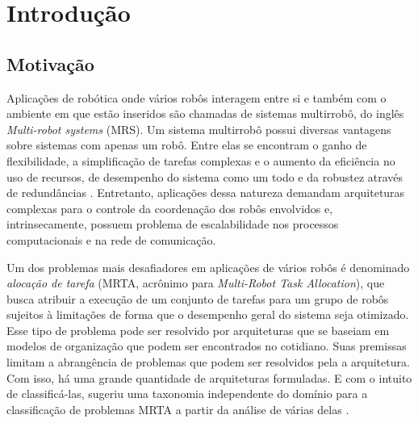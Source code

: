\chapter[Introdução]{Introdução} \label{cap:introducao}

    \section{Motivação} \label{sec:motivacao}
        Aplicações de robótica onde vários robôs interagem entre si e também com o ambiente em que estão inseridos são chamadas de sistemas multirrobô, do inglês \textit{Multi-robot systems} (MRS). Um sistema multirrobô possui diversas vantagens sobre sistemas com apenas um robô. Entre elas se encontram o ganho de flexibilidade, a simplificação de tarefas complexas e o aumento da eficiência no uso de recursos, de desempenho do sistema como um todo e da robustez através de redundâncias \cite{ref:cao1997cooperative, ref:dudek1996taxonomy, ref:zlot2002multi}. Entretanto, aplicações dessa natureza demandam arquiteturas complexas para o controle da coordenação dos robôs envolvidos e, intrinsecamente, possuem problema de escalabilidade nos processos computacionais e na rede de comunicação. 
        
        Um dos problemas mais desafiadores em aplicações de vários robôs é denominado \textit{alocação de tarefa} (MRTA, acrônimo para \textit{Multi-Robot Task Allocation}), que busca atribuir a execução de um conjunto de tarefas para um grupo de robôs sujeitos à limitações de forma que o desempenho geral do sistema seja otimizado. Esse tipo de problema pode ser resolvido por arquiteturas que se baseiam em modelos de organização que podem ser encontrados no cotidiano. Suas premissas limitam a abrangência de problemas que podem ser resolvidos pela a arquitetura. Com isso, há uma grande quantidade de arquiteturas formuladas. E com o intuito de classificá-las,  sugeriu uma taxonomia independente do domínio para a classificação de problemas MRTA a partir da análise de várias delas \cite{ref:parker1998alliance, ref:gerkey2002murdoch, ref:botelho1999m+, ref:werger2000ble, ref:frank2005kuhn, ref:stentz1999fpo, ref:chaimowicz2002dra}. 
        
